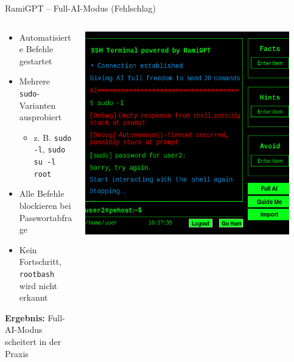 \documentclass[
	aspectratio=169,	%
	onlytextwidth,		%
	t,					%
	]{beamer}
\begin{document}
\begin{frame}{RamiGPT – Full-AI-Modus (Fehlschlag)}
	\begin{columns}
		\begin{column}[T]{.45\textwidth}
				\begin{itemize}
				\item Automatisierte Befehle gestartet
				\item Mehrere \texttt{sudo}-Varianten ausprobiert
				\begin{itemize}
					\item z. B. \texttt{sudo -l}, \texttt{sudo su -l root}
				\end{itemize}
				\item Alle Befehle blockieren bei Passwortabfrage
				\item Kein Fortschritt, \texttt{rootbash} wird nicht erkannt
			\end{itemize}
			\textbf{Ergebnis:} Full-AI-Modus scheitert in der Praxis
		\end{column}
	\begin{column}[T]{.55\textwidth}
		\centering
		\vspace{-7mm}
		\includegraphics[width=0.9\textwidth]{figures/6.png}
		\label{fig:6}
		\end{column}
	\end{columns}
\end{frame}
\end{document}
